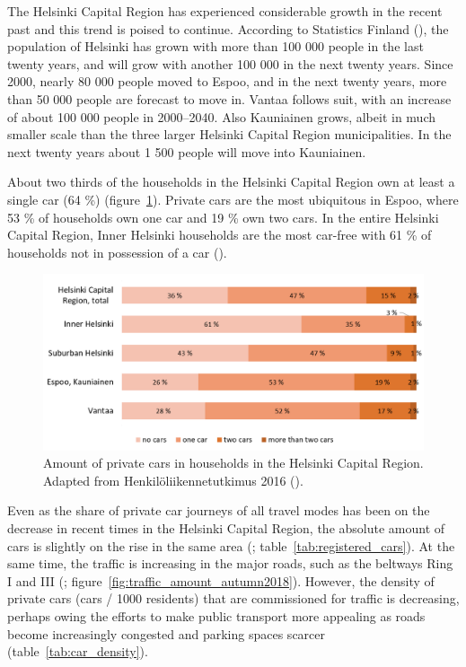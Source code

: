 The Helsinki Capital Region has experienced considerable growth in the recent past and this trend is poised to continue. According to Statistics Finland (\citeyear{StatisticsFinland2020c}), the population of Helsinki has grown with more than 100 000 people in the last twenty years, and will grow with another 100 000 in the next twenty years. Since 2000, nearly 80 000 people moved to Espoo, and in the next twenty years, more than 50 000 people are forecast to move in. Vantaa follows suit, with an increase of about 100 000 people in 2000--2040. Also Kauniainen grows, albeit in much smaller scale than the three larger Helsinki Capital Region municipalities. In the next twenty years about 1 500 people will move into Kauniainen.

About two thirds of the households in the Helsinki Capital Region own at least a single car (64 \%) (figure~\ref{fig:cars_per_household}). Private cars are the most ubiquitous in Espoo, where 53 \% of households own one car and 19 \% own two cars. In the entire Helsinki Capital Region, Inner Helsinki households are the most car-free with 61 \% of households not in possession of a car (\cite{Liikennevirasto2018}).

\begin{figure}[H]%
    \includegraphics[width=\textwidth]{images/hlt_cars_per_household.png}
    \caption[The number of private cars in households in the Helsinki Capital Region]{Amount of private cars in households in the Helsinki Capital Region. Adapted from Henkilöliikennetutkimus 2016 (\cite{Liikennevirasto2018}).}%
    \label{fig:cars_per_household}%
\end{figure}

Even as the share of private car journeys of all travel modes has been on the decrease in recent times in the Helsinki Capital Region, the absolute amount of cars is slightly on the rise in the same area (\cite{Brandt2019}; table~\ref{tab:registered_cars}). At the same time, the traffic is increasing in the major roads, such as the beltways Ring I and III (\cite{Helsinginseudunliikenne2020}; figure~\ref{fig:traffic_amount_autumn2018}). However, the density of private cars (cars / 1000 residents) that are commissioned for traffic is decreasing, perhaps owing the efforts to make public transport more appealing as roads become increasingly congested and parking spaces scarcer (table~\ref{tab:car_density}).

